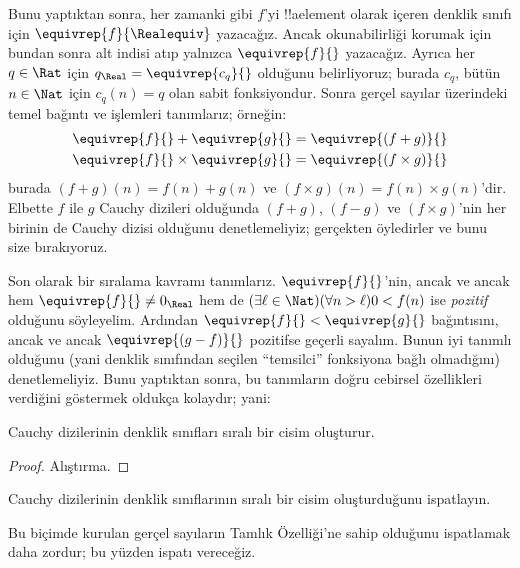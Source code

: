 \documentclass[../../../include/open-logic-section]{subfiles}
\begin{document}
Bunu yaptıktan sonra, her zamanki gibi $f$'yi !!a{element} olarak içeren
denklik sınıfı için $\equivrep{f}{\Realequiv}$ yazacağız. Ancak okunabilirliği
korumak için bundan sonra alt indisi atıp yalnızca $\equivrep{f}{}$ yazacağız.
Ayrıca her $q \in \Rat$ için
$q_{\Real} = \equivrep{c_{q}}{}$ olduğunu belirliyoruz; burada $c_q$, bütün
$n \in \Nat$ için $c_q(n) = q$ olan sabit fonksiyondur. Sonra gerçel sayılar
üzerindeki temel bağıntı ve işlemleri tanımlarız; örneğin:
\begin{align*}
	\equivrep{f}{} + \equivrep{g}{} &= 	\equivrep{(f + g)}{} \\
	\equivrep{f}{} \times 	\equivrep{g}{} &= \equivrep{(f \times g)}{}
\end{align*}
burada $(f + g)(n) = f(n) + g(n)$ ve
$(f \times g)(n) = f(n) \times g(n)$'dir. Elbette $f$ ile $g$ Cauchy
dizileri olduğunda $(f + g)$, $(f-g)$ ve $(f\times g)$'nin her birinin de
Cauchy dizisi olduğunu denetlemeliyiz; gerçekten öyledirler ve bunu size
bırakıyoruz.

Son olarak bir sıralama kavramı tanımlarız. $\equivrep{f}{}$'nin, ancak ve
ancak hem $\equivrep{f}{}\neq 0_\Real$ hem de
$(\exists \ell \in \Nat)(\forall n > \ell)0 < f(n)$ ise \emph{pozitif}
olduğunu söyleyelim. Ardından $\equivrep{f}{} < \equivrep{g}{}$ bağıntısını,
ancak ve ancak $\equivrep{(g - f)}{}$ pozitifse geçerli sayalım. Bunun iyi
tanımlı olduğunu (yani denklik sınıfından seçilen “temsilci” fonksiyona bağlı
olmadığını) denetlemeliyiz.
Bunu yaptıktan sonra, bu tanımların doğru cebirsel özellikleri verdiğini
göstermek oldukça kolaydır; yani:
\begin{thm}
Cauchy dizilerinin denklik sınıfları sıralı bir cisim oluşturur.
\end{thm}

\begin{proof}
Alıştırma.
\end{proof}

\begin{prob}
Cauchy dizilerinin denklik sınıflarının sıralı bir cisim oluşturduğunu
ispatlayın.
\end{prob}

Bu biçimde kurulan gerçel sayıların Tamlık Özelliği'ne sahip olduğunu ispatlamak
daha zordur; bu yüzden ispatı vereceğiz.
\end{document}
